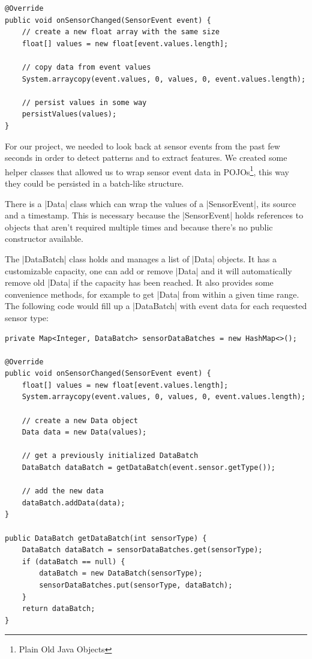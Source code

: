 \begin{lstlisting}[label=arraycopy]
@Override
public void onSensorChanged(SensorEvent event) {
	// create a new float array with the same size
	float[] values = new float[event.values.length];

	// copy data from event values
	System.arraycopy(event.values, 0, values, 0, event.values.length);

	// persist values in some way
	persistValues(values);
}
\end{lstlisting}

For our project, we needed to look back at sensor events from the past few seconds in order to detect patterns and to extract features.
We created some helper classes\cite{sensordatalogger:datapackage} that allowed us to wrap sensor event data in POJOs\footnote{Plain Old Java Objects}, this way they could be persisted in a batch-like structure.

There is a |Data|\cite{sensordatalogger:data} class which can wrap the values of a |SensorEvent|, its source and a timestamp.
This is necessary because the |SensorEvent| holds references to objects that aren't required multiple times and because there's no public constructor available.

The |DataBatch|\cite{sensordatalogger:databatch} class holds and manages a list of |Data| objects.
It has a customizable capacity, one can add or remove |Data| and it will automatically remove old |Data| if the capacity has been reached.
It also provides some convenience methods, for example to get |Data| from within a given time range.
The following code would fill up a |DataBatch| with event data for each requested sensor type:

\begin{lstlisting}[label=datahelperclasses]
private Map<Integer, DataBatch> sensorDataBatches = new HashMap<>();

@Override
public void onSensorChanged(SensorEvent event) {
	float[] values = new float[event.values.length];
	System.arraycopy(event.values, 0, values, 0, event.values.length);

	// create a new Data object
	Data data = new Data(values);

	// get a previously initialized DataBatch
	DataBatch dataBatch = getDataBatch(event.sensor.getType());

	// add the new data
	dataBatch.addData(data);
}

public DataBatch getDataBatch(int sensorType) {
	DataBatch dataBatch = sensorDataBatches.get(sensorType);
	if (dataBatch == null) {
		dataBatch = new DataBatch(sensorType);
		sensorDataBatches.put(sensorType, dataBatch);
	}
	return dataBatch;
}
\end{lstlisting}

